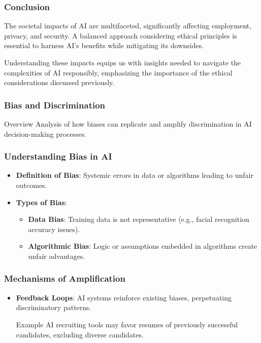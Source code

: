 \documentclass[aspectratio=169]{beamer}
\begin{document}
\begin{frame}[fragile]
    \frametitle{Conclusion}
    The societal impacts of AI are multifaceted, significantly affecting employment, privacy, and security. 
    A balanced approach considering ethical principles is essential to harness AI's benefits while mitigating its downsides.

    Understanding these impacts equips us with insights needed to navigate the complexities of AI responsibly,
    emphasizing the importance of the ethical considerations discussed previously.
\end{frame}

\begin{frame}[fragile]
    \frametitle{Bias and Discrimination}
    \begin{block}{Overview}
        Analysis of how biases can replicate and amplify discrimination in AI decision-making processes.
    \end{block}
\end{frame}

\begin{frame}[fragile]
    \frametitle{Understanding Bias in AI}
    \begin{itemize}
        \item \textbf{Definition of Bias}: Systemic errors in data or algorithms leading to unfair outcomes.
        \item \textbf{Types of Bias}:
            \begin{itemize}
                \item \textbf{Data Bias}: Training data is not representative (e.g., facial recognition accuracy issues).
                \item \textbf{Algorithmic Bias}: Logic or assumptions embedded in algorithms create unfair advantages.
            \end{itemize}
    \end{itemize}
\end{frame}

\begin{frame}[fragile]
    \frametitle{Mechanisms of Amplification}
    \begin{itemize}
        \item \textbf{Feedback Loops}: AI systems reinforce existing biases, perpetuating discriminatory patterns.
        \begin{block}{Example}
            AI recruiting tools may favor resumes of previously successful candidates, excluding diverse candidates.
        \end{block}
    \end{itemize}
\end{frame}
\end{document}
